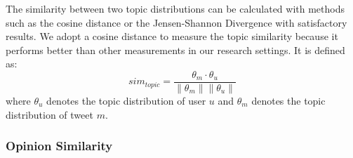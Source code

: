 \documentclass[letterpaper]{article}
\begin{document}
The similarity between two topic distributions can be calculated with methods such as the cosine distance \cite{cha2007comprehensive} or the Jensen-Shannon Divergence \cite{weng2010twitterrank} with satisfactory results.
We adopt a cosine distance to measure the topic similarity because it performs better than other measurements in our research settings. It is defined as:
\begin{equation}
sim_{topic}=\dfrac{\theta_{m} \cdot \theta_{u}}{\parallel \theta_{m} \parallel \parallel \theta_{u} \parallel}
\end{equation}
where $ \theta_{u}$ denotes the topic distribution of user $ u $ and $\theta_{m}$ denotes the topic distribution of tweet $ m $. 

\subsubsection{Opinion Similarity}
\label{opsim}
\end{document}
